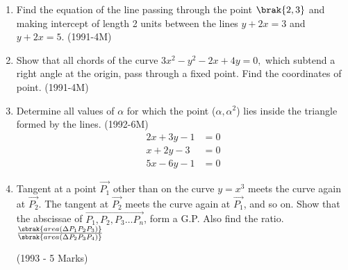 \begin{enumerate}
\item Find the equation of the line passing through the point $\brak{2,3}$ and making intercept of length 2 units between the lines $ y + 2x = 3 $ and $ y + 2x = 5  $.     \hfill{(1991-4M)}
  \begin{center}
\end{center}

	
\item Show that all chords of  the curve $ 3x^2-y^2-2x+4y=0,$ which subtend a right angle at the origin, pass through a fixed point. Find the coordinates of point.     \hfill{(1991-4M)}

\item Determine all values of $\alpha$ for which the point ($\alpha , \alpha^2$) lies inside the triangle formed by the lines.  \hfill{(1992-6M)}
	\begin{align*}  2x+3y-1&=0\\ 
	x+2y-3&=0  \\ 5x-6y-1&=0   \end{align*}

	\item Tangent at a point $\vec{P_{1}}$ {other than } on the curve $y=x^{3}$ meets the curve again at $\vec{P_{2}}$. The tangent at $\vec{P_{2}}$ meets the curve again at $\vec{P_{1}}$, and so on. Show that the abscissae of $\vec{P_{1}, P_{2}, P_{3} \dots P_{n}}$, form a G.P. Also find the ratio. $\frac{\sbrak{area(\Delta P_{1}P_{2}P_{3})}}{\sbrak{area(\Delta P_{2}P_{3}P_{4})}}$

	\hfill{(1993 - 5 Marks)}


\end{enumerate}
